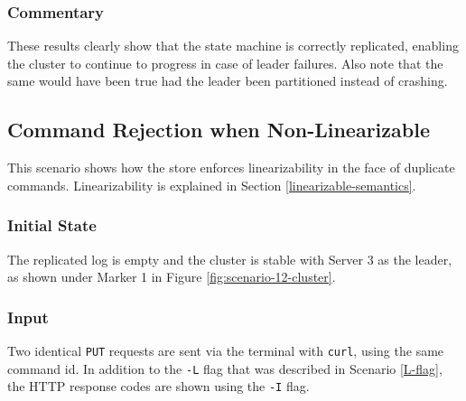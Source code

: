 \subsubsection{Commentary}

These results clearly show that the state machine is correctly replicated, enabling the cluster to continue to progress in case of leader failures. Also note that the same would have been true had the leader been partitioned instead of crashing.

\subsection{Command Rejection when Non-Linearizable}

This scenario shows how the store enforces linearizability in the face of duplicate commands. Linearizability is explained in Section \ref{linearizable-semantics}.

\subsubsection{Initial State}
The replicated log is empty and the cluster is stable with Server 3 as the leader, as shown under Marker 1 in Figure \ref{fig:scenario-12-cluster}.

\subsubsection{Input}
Two identical \lstinline|PUT| requests are sent via the terminal with \lstinline|curl|, using the same command id. In addition to the \lstinline|-L| flag that was described in Scenario \ref{L-flag}, the HTTP response codes are shown using the \lstinline|-I| flag. 

